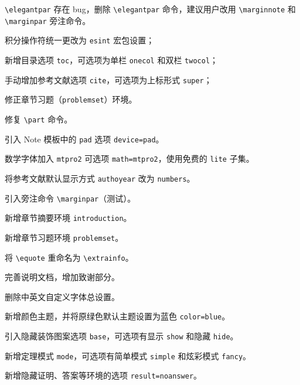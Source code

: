 \documentclass[lang=cn,10pt]{elegantbook}
\begin{document}
\begin{change}
  \item \lstinline{\elegantpar} 存在 bug，删除 \lstinline{\elegantpar} 命令，建议用户改用 \lstinline{\marginnote} 和 \lstinline{\marginpar} 旁注命令。
  \item 积分操作符统一更改为 \lstinline{esint} 宏包设置；
  \item 新增目录选项 \lstinline{toc}，可选项为单栏 \lstinline{onecol} 和双栏 \lstinline{twocol}；
  \item 手动增加参考文献选项 \lstinline{cite}，可选项为上标形式 \lstinline{super}；
  \item 修正章节习题（\lstinline{problemset}）环境。
\end{change}


\begin{change}
  \item 修复 \lstinline{\part} 命令。
  \item 引入 Note 模板中的 \lstinline{pad} 选项 \lstinline{device=pad}。
  \item 数学字体加入 \lstinline{mtpro2} 可选项 \lstinline{math=mtpro2}，使用免费的 \lstinline{lite} 子集。
  \item 将参考文献默认显示方式 \lstinline{authoyear} 改为 \lstinline{numbers}。
  \item 引入旁注命令 \lstinline{\marginpar}（测试）。
  \item 新增章节摘要环境 \lstinline{introduction}。
  \item 新增章节习题环境 \lstinline{problemset}。
  \item 将 \lstinline{\equote} 重命名为 \lstinline{\extrainfo}。
  \item 完善说明文档，增加致谢部分。
\end{change}


\begin{change}
  \item 删除中英文自定义字体总设置。
  \item 新增颜色主题，并将原绿色默认主题设置为蓝色 \lstinline{color=blue}。
  \item 引入隐藏装饰图案选项 \lstinline{base}，可选项有显示 \lstinline{show} 和隐藏 \lstinline{hide}。
  \item 新增定理模式 \lstinline{mode}，可选项有简单模式 \lstinline{simple} 和炫彩模式 \lstinline{fancy}。
  \item 新增隐藏证明、答案等环境的选项 \lstinline{result=noanswer}。
\end{change}
\end{document}

